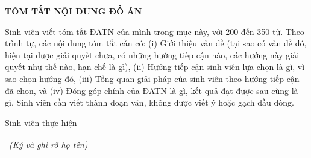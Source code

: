 \documentclass[../DoAn.tex]{subfiles}
\begin{document}
\begin{center}
    \Large{\textbf{TÓM TẮT NỘI DUNG ĐỒ ÁN}}\\
\end{center}
\vspace{1cm}
Sinh viên viết tóm tắt ĐATN của mình trong mục này, với 200 đến 350 từ. Theo trình tự, các nội dung tóm tắt cần có: (i) Giới thiệu vấn đề (tại sao có vấn đề đó, hiện tại được giải quyết chưa, có những hướng tiếp cận nào, các hướng này giải quyết như thế nào, hạn chế là gì), (ii) Hướng tiếp cận sinh viên lựa chọn là gì, vì sao chọn hướng đó, (iii) Tổng quan giải pháp của sinh viên theo hướng tiếp cận đã chọn, và (iv) Đóng góp chính của ĐATN là gì, kết quả đạt được sau cùng là gì. Sinh viên cần viết thành đoạn văn, không được viết ý hoặc gạch đầu dòng.
\begin{flushright}
Sinh viên thực hiện\\
\begin{tabular}{@{}c@{}}
\textit{(Ký và ghi rõ họ tên)}
\end{tabular}
\end{flushright}
\end{document}
